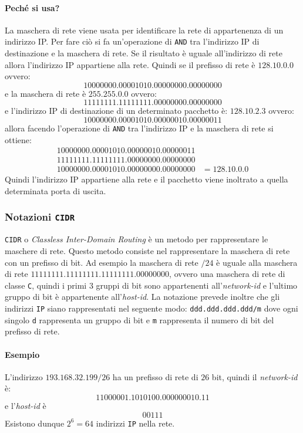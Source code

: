             \paragraph{Peché si usa?} La maschera di rete viene usata per identificare la rete di appartenenza di un indirizzo IP. Per fare ciò si fa un'operazione di \texttt{AND} tra l'indirizzo IP di destinazione e la maschera di rete. Se il risultato è uguale all'indirizzo di rete allora l'indirizzo IP appartiene alla rete. Quindi se il prefisso di rete è $128.10.0.0$ ovvero: \[10000000.00001010.00000000.00000000\] e la maschera di rete è $255.255.0.0$ ovvero: \[11111111.11111111.00000000.00000000\] e l'indirizzo IP di destinazione di un determinato pacchetto è: $128.10.2.3$ ovvero: \[10000000.00001010.00000010.00000011\] allora facendo l'operazione di \texttt{AND} tra l'indirizzo IP e la maschera di rete si ottiene: \[\begin{aligned}
                10000000.00001010.00000010.00000011 &\\
                11111111.11111111.00000000.00000000 &\\
                \hline
                10000000.00001010.00000000.00000000&=128.10.0.0
            \end{aligned}
            \] Quindi l'indirizzo IP appartiene alla rete e il pacchetto viene inoltrato a quella determinata porta di uscita.
        \subsubsection{Notazioni \texttt{CIDR}}
            \texttt{CIDR} o \textit{Classless Inter-Domain Routing} è un metodo per rappresentare le maschere di rete. Questo metodo consiste nel rappresentare la maschera di rete con un prefisso di bit. Ad esempio la maschera di rete $/24$ è uguale alla maschera di rete $11111111.11111111.11111111.00000000$, ovvero una maschera di rete di classe \texttt{C}, quindi i primi $3$ gruppi di bit sono appartenenti all'\textit{network-id} e l'ultimo gruppo di bit è appartenente all'\textit{host-id}. La notazione prevede inoltre che gli indirizzi \texttt{IP} siano rappresentati nel seguente modo: \texttt{ddd.ddd.ddd.ddd/m} dove ogni singolo \texttt{d} rappresenta un gruppo di bit e \texttt{m} rappresenta il numero di bit del prefisso di rete.
            \paragraph{Esempio} L'indirizzo $193.168.32.199/26$ ha un prefisso di rete di $26$ bit, quindi il \textit{network-id} è: $$11000001.1010100.000000010.11$$ e l'\textit{host-id} è $$00111$$ Esistono dunque $2^6=64$ indirizzi \texttt{IP} nella rete.
